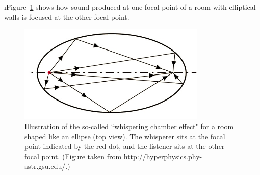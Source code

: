 \i Figure~\ref{f:whispering_chamber} shows how 
sound produced at one focal point of a room 
with elliptical walls is focused at the 
other focal point. 
%
\begin{figure}[htbp]
\begin{center}
\includegraphics[width=0.8\textwidth]{whispering_chamber}
\caption{Illustration of the so-called
``whispering chamber effect"
for a room shaped like an ellipse (top view).
The whisperer sits at the focal point indicated by
the red dot, and the listener sits at the other 
focal point.
(Figure taken from  
{http://hyperphysics.phy-astr.gsu.edu/}.)}
\label{f:whispering_chamber}
\end{center}
\end{figure}
%

